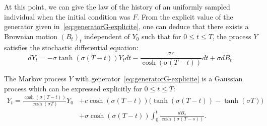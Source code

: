 \documentclass[AHL,Unicode,longabstracts,published]{cedram}
\begin{document}
At this point, we can give the law of the history of an uniformly sampled individual when the initial condition was $F$. From the explicit value of the generator given in~\eqref{eq:generatorG-explicite}, one can deduce that there exists a Brownian motion $(B_{t})_{t}$ independent of $Y_0$ such that for $0\leq t \leq T$, the process $Y$ satisfies the stochastic differential equation:
\begin{equation}\label{SDE-Y}
dY_{t}=-\sigma \tanh(\sigma(T-t))Y_{t}dt - \frac{\sigma c}{\cosh (\sigma(T-t))} dt+\sigma d B_{t}.
\end{equation}

\begin{prop}\label{prop:Ytilde-resolu}
The Markov process $Y$ with generator~\eqref{eq:generatorG-explicite} is a Gaussian process which can be expressed explicitly for $0\leq t\leq T$:
\begin{equation}\label{eq:Ytilde-resolu}
\begin{split}
Y_t= \frac{\cosh(\sigma(T-t))}{\cosh(\sigma T)}Y_0 &+ c \cosh(\sigma(T-t)) \big(\tanh(\sigma(T-t))-\tanh(\sigma T)\big)\\
&+\sigma \cosh(\sigma(T-t)) \int_{0}^{t}\frac{dB_s}{\cosh(\sigma(T-s))}.
\end{split}
\end{equation}
\end{prop}
\end{document}
